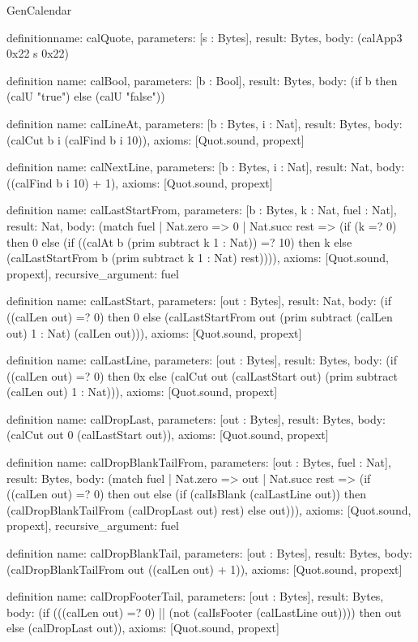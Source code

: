 \begin{lexlean}{GenCalendar}
\begin{semanticmodule}
definition{name: calQuote, parameters: [s : Bytes], result: Bytes, body: (calApp3 0x22 s 0x22)}

definition{
  name: calBool,
  parameters: [b : Bool],
  result: Bytes,
  body: (if b then (calU "true") else (calU "false"))
}

definition{
  name: calLineAt,
  parameters: [b : Bytes, i : Nat],
  result: Bytes,
  body: (calCut b i (calFind b i 10)),
  axioms: [Quot.sound, propext]
}

definition{
  name: calNextLine,
  parameters: [b : Bytes, i : Nat],
  result: Nat,
  body: ((calFind b i 10) + 1),
  axioms: [Quot.sound, propext]
}

definition{
  name: calLastStartFrom,
  parameters: [b : Bytes, k : Nat, fuel : Nat],
  result: Nat,
  body: (match fuel
    | Nat.zero => 0
    | Nat.succ rest => (if (k =? 0) then 0 else (if ((calAt b (prim subtract k 1 : Nat)) =? 10) then k else (calLastStartFrom b (prim subtract k 1 : Nat) rest)))),
  axioms: [Quot.sound, propext],
  recursive_argument: fuel
}

definition{
  name: calLastStart,
  parameters: [out : Bytes],
  result: Nat,
  body: (if ((calLen out) =? 0) then 0 else (calLastStartFrom out (prim subtract (calLen out) 1 : Nat) (calLen out))),
  axioms: [Quot.sound, propext]
}

definition{
  name: calLastLine,
  parameters: [out : Bytes],
  result: Bytes,
  body: (if ((calLen out) =? 0) then 0x else (calCut out (calLastStart out) (prim subtract (calLen out) 1 : Nat))),
  axioms: [Quot.sound, propext]
}

definition{
  name: calDropLast,
  parameters: [out : Bytes],
  result: Bytes,
  body: (calCut out 0 (calLastStart out)),
  axioms: [Quot.sound, propext]
}

definition{
  name: calDropBlankTailFrom,
  parameters: [out : Bytes, fuel : Nat],
  result: Bytes,
  body: (match fuel
    | Nat.zero => out
    | Nat.succ rest => (if ((calLen out) =? 0) then out else (if (calIsBlank (calLastLine out)) then (calDropBlankTailFrom (calDropLast out) rest) else out))),
  axioms: [Quot.sound, propext],
  recursive_argument: fuel
}

definition{
  name: calDropBlankTail,
  parameters: [out : Bytes],
  result: Bytes,
  body: (calDropBlankTailFrom out ((calLen out) + 1)),
  axioms: [Quot.sound, propext]
}

definition{
  name: calDropFooterTail,
  parameters: [out : Bytes],
  result: Bytes,
  body: (if (((calLen out) =? 0) || (not (calIsFooter (calLastLine out)))) then out else (calDropLast out)),
  axioms: [Quot.sound, propext]
}


\end{semanticmodule}
\end{lexlean}
